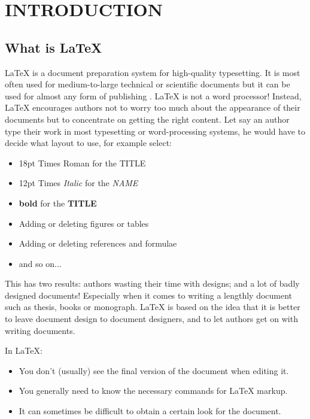 \chapter{INTRODUCTION}

\section{What is {\LaTeX}}

{\LaTeX} is a document preparation system for high-quality typesetting. It is most often used for medium-to-large technical or scientific documents but it can be used for almost any form of publishing \citep{Carvalho-etal-2008}.  {\LaTeX} is not a word processor! Instead,  {\LaTeX} encourages authors not to worry too much about the appearance of their documents but to concentrate on getting the right content. Let say an author type their work in most typesetting or word-processing systems, he would have to decide what layout to use, for example select:

\begin{itemize}
\item {\Large18pt Times Roman} for the {\Large TITLE}
\item 12pt Times \emph{Italic} for the \emph{NAME}
\item \textbf{bold} for the \textbf{TITLE}
\item Adding or deleting figures or tables
\item Adding or deleting references and formulae
\item and so on...
\end{itemize}

This has two results: authors wasting their time with designs; and a lot of badly designed documents! Especially when it comes to writing a lengthly document such as thesis, books or monograph. {\LaTeX} is based on the idea that it is better to leave document design to document designers, and to let authors get on with writing documents.

In {\LaTeX}:
\begin{itemize}
\item You don't (usually) see the final version of the document when editing it.
\item You generally need to know the necessary commands for LaTeX markup.
\item It can sometimes be difficult to obtain a certain look for the document.
\end{itemize}

